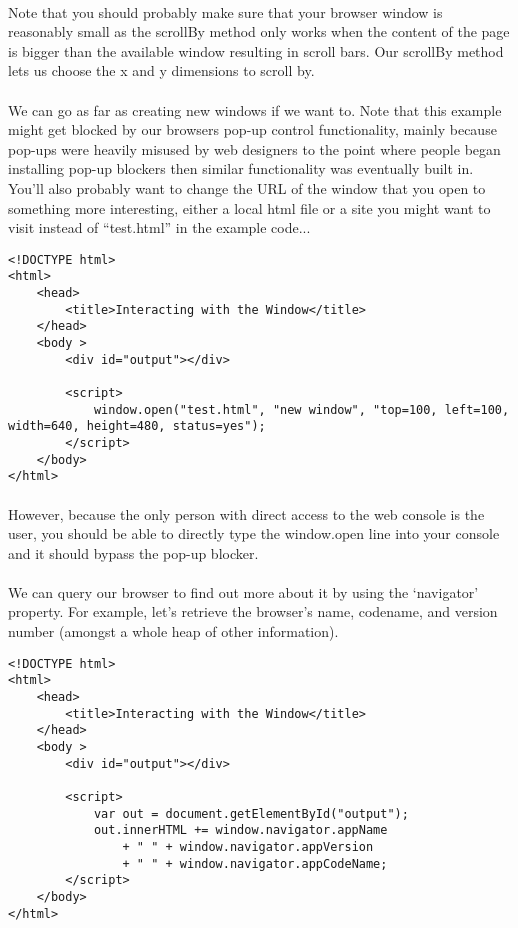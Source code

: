 \documentclass[10pt, a4paper, twosize]{article}
\begin{document}
\paragraph{} Note that you should probably make sure that your browser window is reasonably small as the scrollBy method only works when the content of the page is bigger than the available window resulting in scroll bars. Our scrollBy method lets us choose the x and y dimensions to scroll by.

\paragraph{} We can go as far as creating new windows if we want to. Note that this example might get blocked by our browsers pop-up control functionality, mainly because pop-ups were heavily misused by web designers to the point where people began installing pop-up blockers then similar functionality was eventually built in. You'll also probably want to change the URL of the window that you open to something more interesting, either a local html file or a site you might want to visit instead of ``test.html'' in the example code...

\begin{lstlisting}
<!DOCTYPE html>
<html>
    <head>
        <title>Interacting with the Window</title>
    </head>
    <body >
        <div id="output"></div>

        <script>
            window.open("test.html", "new window", "top=100, left=100, width=640, height=480, status=yes");            
        </script>
    </body>
</html>
\end{lstlisting}

\paragraph{} However, because the only person with direct access to the web console is the user, you should be able to directly type the window.open line into your console and it should bypass the pop-up blocker.

\paragraph{} We can query our browser to find out more about it by using the `navigator' property. For example, let's retrieve the browser's name, codename, and version number (amongst a whole heap of other information).

\begin{lstlisting}
<!DOCTYPE html>
<html>
    <head>
        <title>Interacting with the Window</title>
    </head>
    <body >
        <div id="output"></div>

        <script>
            var out = document.getElementById("output");
            out.innerHTML += window.navigator.appName 
                + " " + window.navigator.appVersion 
                + " " + window.navigator.appCodeName;
        </script>
    </body>
</html>
\end{lstlisting}
\end{document}
